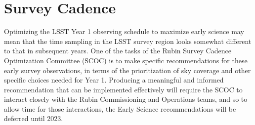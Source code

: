 \section{Survey Cadence}

Optimizing the LSST Year 1 observing schedule to maximize early science may mean that the time sampling in the LSST survey region looks somewhat different to that in subsequent years.
One of the tasks of the Rubin Survey Cadence Optimization Committee (SCOC) is to make specific recommendations for these early survey observations, in terms of the prioritization of sky coverage and other specific choices needed for Year 1.
Producing a meaningful and informed recommendation that can be implemented effectively will require the SCOC to interact closely with the Rubin Commissioning and Operations teams, and so to allow time for those interactions, the Early Science recommendations will be deferred until 2023. 
